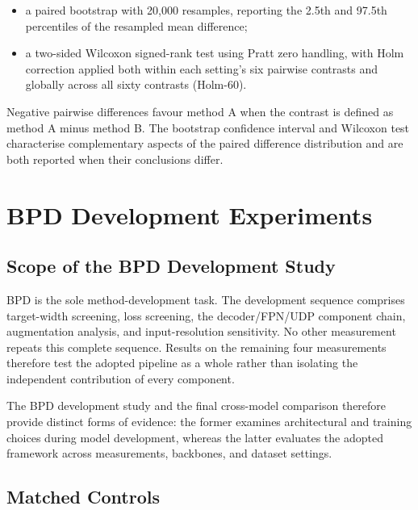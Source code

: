 \begin{itemize}

  \item a paired bootstrap with 20{,}000 resamples, reporting the
    2.5th and 97.5th percentiles of the resampled mean difference;

  \item a two-sided Wilcoxon signed-rank test using Pratt zero
    handling, with Holm correction applied both within each
    setting's six pairwise contrasts and globally across all sixty
    contrasts (Holm-60).

\end{itemize}

Negative pairwise differences favour method A when the contrast is
defined as method A minus method B. The bootstrap confidence interval
and Wilcoxon test characterise complementary aspects of the paired
difference distribution and are both reported when their conclusions
differ.



\section{BPD Development Experiments}
\label{sec:setup-bpd-development}


\subsection{Scope of the BPD Development Study}
\label{sec:setup-evidence-scope}

BPD is the sole method-development task. The development sequence
comprises target-width screening, loss screening, the
decoder/FPN/UDP component chain, augmentation analysis, and
input-resolution sensitivity. No other measurement repeats this
complete sequence. Results on the remaining four measurements
therefore test the adopted pipeline as a whole rather than isolating
the independent contribution of every component.

The BPD development study and the final cross-model comparison
therefore provide distinct forms of evidence: the former examines
architectural and training choices during model development, whereas
the latter evaluates the adopted framework across measurements,
backbones, and dataset settings.


\subsection{Matched Controls}

